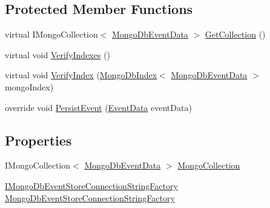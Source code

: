 \subsection*{Protected Member Functions}
\begin{DoxyCompactItemize}
\item 
virtual I\+Mongo\+Collection$<$ \hyperlink{classCqrs_1_1MongoDB_1_1Events_1_1MongoDbEventData}{Mongo\+Db\+Event\+Data} $>$ \hyperlink{classCqrs_1_1MongoDB_1_1Events_1_1MongoDbEventStore_aa6a9499aa1dcde55d82d8e0f3b5bd077_aa6a9499aa1dcde55d82d8e0f3b5bd077}{Get\+Collection} ()
\item 
virtual void \hyperlink{classCqrs_1_1MongoDB_1_1Events_1_1MongoDbEventStore_a60ae02928a3ae8cb99d46f6c340b5138_a60ae02928a3ae8cb99d46f6c340b5138}{Verify\+Indexes} ()
\item 
virtual void \hyperlink{classCqrs_1_1MongoDB_1_1Events_1_1MongoDbEventStore_a6a6f0303cd412974d90be87d281e81f5_a6a6f0303cd412974d90be87d281e81f5}{Verify\+Index} (\hyperlink{classCqrs_1_1MongoDB_1_1DataStores_1_1Indexes_1_1MongoDbIndex}{Mongo\+Db\+Index}$<$ \hyperlink{classCqrs_1_1MongoDB_1_1Events_1_1MongoDbEventData}{Mongo\+Db\+Event\+Data} $>$ mongo\+Index)
\item 
override void \hyperlink{classCqrs_1_1MongoDB_1_1Events_1_1MongoDbEventStore_a13f6823671d7cb9c042d8f7156a51b89_a13f6823671d7cb9c042d8f7156a51b89}{Persist\+Event} (\hyperlink{classCqrs_1_1Events_1_1EventData}{Event\+Data} event\+Data)
\end{DoxyCompactItemize}
\subsection*{Properties}
\begin{DoxyCompactItemize}
\item 
I\+Mongo\+Collection$<$ \hyperlink{classCqrs_1_1MongoDB_1_1Events_1_1MongoDbEventData}{Mongo\+Db\+Event\+Data} $>$ \hyperlink{classCqrs_1_1MongoDB_1_1Events_1_1MongoDbEventStore_af2dfb3af9b76e8b1cab0f7dc68cdc377_af2dfb3af9b76e8b1cab0f7dc68cdc377}{Mongo\+Collection}
\item 
\hyperlink{interfaceCqrs_1_1MongoDB_1_1Events_1_1IMongoDbEventStoreConnectionStringFactory}{I\+Mongo\+Db\+Event\+Store\+Connection\+String\+Factory} \hyperlink{classCqrs_1_1MongoDB_1_1Events_1_1MongoDbEventStore_aa008df8aa5d4e63a2123735acb7cd775_aa008df8aa5d4e63a2123735acb7cd775}{Mongo\+Db\+Event\+Store\+Connection\+String\+Factory}
\end{DoxyCompactItemize}
